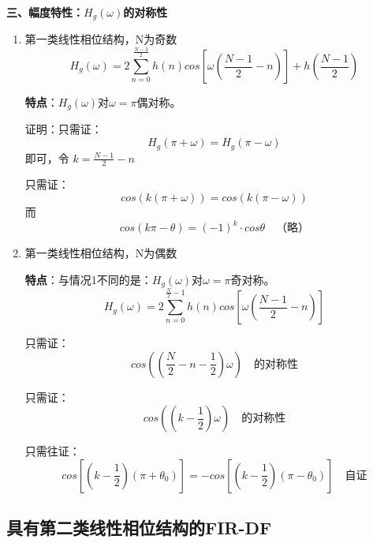 \documentclass[notheorems,compress,mathserif,table]{beamer}
\begin{document}
\begin{frame}[allowframebreaks]\frametitle{}%


\textbf{三、幅度特性：$H_g(\omega)$的对称性}

\begin{enumerate}
  \item
      第一类线性相位结构，N为奇数
      $$H_g(\omega) = 2\sum_{n=0}^{\frac{N-3}{2}}h(n)
      cos\left[\omega(\frac{N-1}{2}-n)\right]+h(\frac{N-1}{2})$$

      \textbf{特点}：$H_g(\omega)$对$\omega = \pi$偶对称。

      证明：只需证：$$H_g(\pi+\omega)=H_g(\pi-\omega)$$
            即可，令  $ k = \frac{N-1}{2}-n$

            只需证：
            $$cos(k(\pi+\omega))=cos(k(\pi-\omega))$$
            而
            $$cos(k\pi-\theta)= (-1)^k\cdot cos\theta\quad\mbox{（略）}$$
  \item
      第一类线性相位结构，N为偶数

      \textbf{特点}：与情况1不同的是：$H_g(\omega)$对$\omega = \pi$奇对称。
      $$H_g(\omega)= 2\sum_{n=0}^{\frac{N}{2}-1}h(n)
      cos\left[\omega(\frac{N-1}{2}-n)\right]$$

      只需证：$$cos\left((\frac{N}{2}-n-\frac{1}{2})\omega\right) \quad\mbox{的对称性}$$

      只需证：$$cos\left((k-\frac{1}{2})\omega\right) \quad\mbox{的对称性}$$

      只需往证：
      $$cos\left[(k-\frac{1}{2})(\pi+\theta_0)\right]=
        -cos\left[(k-\frac{1}{2})(\pi-\theta_0)\right] \quad\mbox{自证}$$
\end{enumerate}
\end{frame}
\subsection{具有第二类线性相位结构的FIR-DF}
\end{document}
